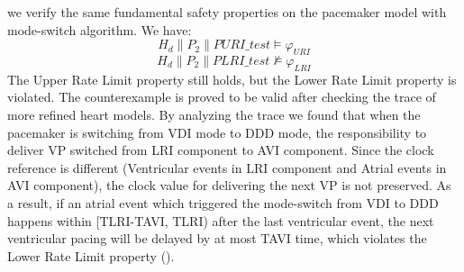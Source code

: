 we verify the same fundamental safety properties on the pacemaker model with mode-switch algorithm. We have:
$$H_d\|P_2\|PURI\_test\models\varphi_{URI}$$
$$H_d\|P_2\|PLRI\_test\not\models\varphi_{LRI}$$
The Upper Rate Limit property still holds, but the Lower Rate Limit property is violated. The counterexample is proved to be valid after checking the trace of more refined heart models. By analyzing the trace we found that when the pacemaker is switching from VDI mode to DDD mode, the responsibility to deliver VP switched from LRI component to AVI component. Since the clock reference is different (Ventricular events in LRI component and Atrial events in AVI component), the clock value for delivering the next VP is not preserved. As a result, if an atrial event which triggered the mode-switch from VDI to DDD happens within [TLRI-TAVI, TLRI) after the last ventricular event, the next ventricular pacing will be delayed by at most TAVI time, which violates the Lower Rate Limit property (). 
